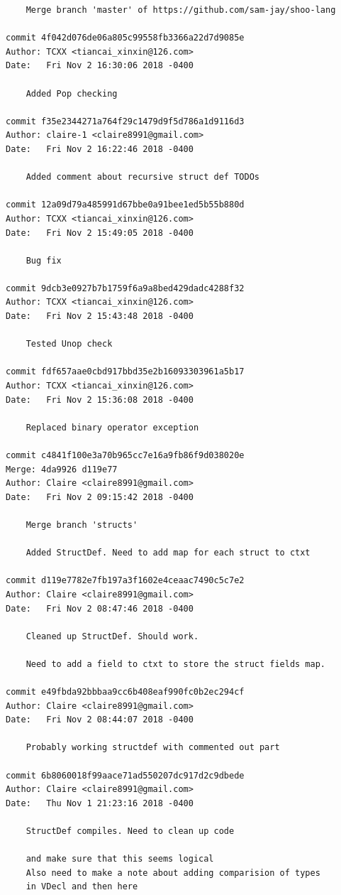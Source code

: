 \documentclass[12pt]{article}
\begin{document}
\begin{lstlisting}
    Merge branch 'master' of https://github.com/sam-jay/shoo-lang

commit 4f042d076de06a805c99558fb3366a22d7d9085e
Author: TCXX <tiancai_xinxin@126.com>
Date:   Fri Nov 2 16:30:06 2018 -0400

    Added Pop checking

commit f35e2344271a764f29c1479d9f5d786a1d9116d3
Author: claire-1 <claire8991@gmail.com>
Date:   Fri Nov 2 16:22:46 2018 -0400

    Added comment about recursive struct def TODOs

commit 12a09d79a485991d67bbe0a91bee1ed5b55b880d
Author: TCXX <tiancai_xinxin@126.com>
Date:   Fri Nov 2 15:49:05 2018 -0400

    Bug fix

commit 9dcb3e0927b7b1759f6a9a8bed429dadc4288f32
Author: TCXX <tiancai_xinxin@126.com>
Date:   Fri Nov 2 15:43:48 2018 -0400

    Tested Unop check

commit fdf657aae0cbd917bbd35e2b16093303961a5b17
Author: TCXX <tiancai_xinxin@126.com>
Date:   Fri Nov 2 15:36:08 2018 -0400

    Replaced binary operator exception

commit c4841f100e3a70b965cc7e16a9fb86f9d038020e
Merge: 4da9926 d119e77
Author: Claire <claire8991@gmail.com>
Date:   Fri Nov 2 09:15:42 2018 -0400

    Merge branch 'structs'
    
    Added StructDef. Need to add map for each struct to ctxt

commit d119e7782e7fb197a3f1602e4ceaac7490c5c7e2
Author: Claire <claire8991@gmail.com>
Date:   Fri Nov 2 08:47:46 2018 -0400

    Cleaned up StructDef. Should work.
    
    Need to add a field to ctxt to store the struct fields map.

commit e49fbda92bbbaa9cc6b408eaf990fc0b2ec294cf
Author: Claire <claire8991@gmail.com>
Date:   Fri Nov 2 08:44:07 2018 -0400

    Probably working structdef with commented out part

commit 6b8060018f99aace71ad550207dc917d2c9dbede
Author: Claire <claire8991@gmail.com>
Date:   Thu Nov 1 21:23:16 2018 -0400

    StructDef compiles. Need to clean up code
    
    and make sure that this seems logical
    Also need to make a note about adding comparision of types
    in VDecl and then here


\end{lstlisting}
\end{document}
